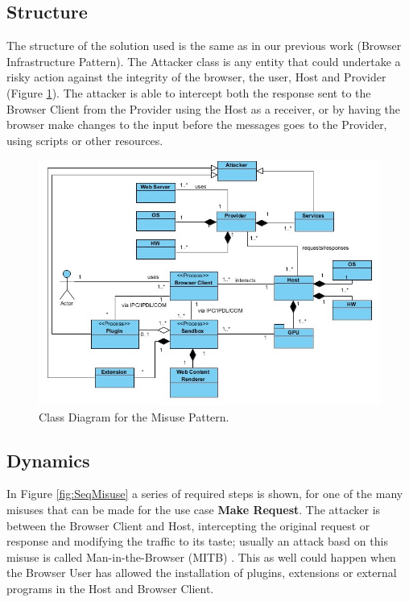 \documentclass{sig-alternate-05-2015}
\begin{document}
\subsection*{Structure}
The structure of the solution used is the same as in our previous work (Browser Infrastructure Pattern). The Attacker class is any entity that could undertake a risky action against the integrity of the browser, the user, Host and Provider (Figure \ref{fig:BIMisuse}). The attacker is able to intercept both the response sent to the Browser Client from the Provider using the Host as a receiver, or by having the browser make changes to the input before the messages goes to the Provider, using scripts or other resources.  

\begin{figure}[h!t]
  \centering
  \includegraphics[scale=0.85]{figures/patronMisuse_v6.jpg}
  \caption{Class Diagram for the Misuse Pattern.}
  \label{fig:BIMisuse}
\end{figure}

\subsection*{Dynamics}
In Figure \ref{fig:SeqMisuse} a series of required steps is shown, for one of the many misuses that can be made for the use case \textbf{Make Request}. The attacker is between the Browser Client and Host, intercepting the original request or response and modifying the traffic to its taste; usually an attack basd on this misuse is called Man-in-the-Browser (MITB) \cite{Liu2012, Barth2010, Utakrit2009, Dougan2012}. This as well could happen when the Browser User has allowed the installation of plugins, extensions or external programs in the Host and Browser Client.
\end{document}
